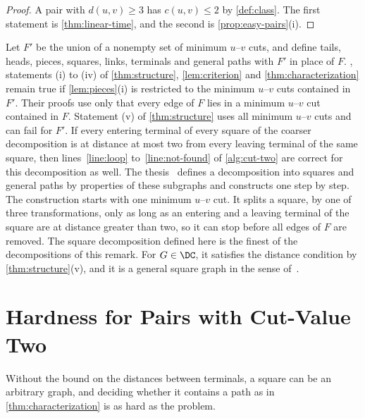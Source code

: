 \begin{proof}
A pair with $d(u, v) \geq 3$ has $c(u, v) \leq 2$ by \cref{def:class}.
The first statement is \cref{thm:linear-time}, and the second is \cref{prop:easy-pairs}(i).
\end{proof}

\begin{remark}
\label{rem:coarser}
Let $F'$ be the union of a nonempty set of minimum $u$--$v$ cuts, and define tails, heads, pieces, squares, links, terminals and general paths with $F'$ in place of $F$.
, statements (i) to (iv) of \cref{thm:structure}, \cref{lem:criterion} and \cref{thm:characterization} remain true if \cref{lem:pieces}(i) is restricted to the minimum $u$--$v$ cuts contained in $F'$.
Their proofs use only that every edge of $F$ lies in a minimum $u$--$v$ cut contained in $F$.
Statement (v) of \cref{thm:structure} uses all minimum $u$--$v$ cuts and can fail for $F'$.
If every entering terminal of every square of the coarser decomposition is at distance at most two from every leaving terminal of the same square, then lines~\ref{line:loop} to~\ref{line:not-found} of \cref{alg:cut-two} are correct for this decomposition as well.
The thesis~\cite[Section~3.3]{Michel2025Thesis} defines a decomposition into squares and general paths by properties of these subgraphs and constructs one step by step.
The construction starts with one minimum $u$--$v$ cut.
It splits a square, by one of three transformations, only as long as an entering and a leaving terminal of the square are at distance greater than two, so it can stop before all edges of $F$ are removed.
The square decomposition defined here is the finest of the decompositions of this remark.
For $G \in \DC$, it satisfies the distance condition by \cref{thm:structure}(v), and it is a general square graph in the sense of~\cite[Definition~40]{Michel2025Thesis}.
\end{remark}

\section{Hardness for Pairs with Cut-Value Two}
\label{sec:hardness}

Without the bound on the distances between terminals, a square can be an arbitrary graph, and deciding whether it contains a path as in \cref{thm:characterization} is as hard as the \SSP{} problem.

